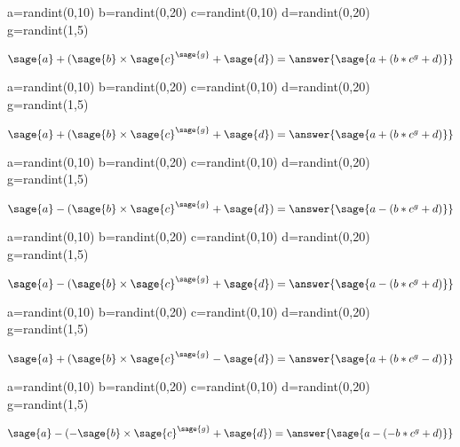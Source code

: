 \documentclass{ximera}
\begin{document}
\begin{problem}
\begin{sagesilent}
a=randint(0,10)
b=randint(0,20)
c=randint(0,10)
d=randint(0,20)
g=randint(1,5)
\end{sagesilent}
$ \sage{a} + (\sage{b} \times \sage{c}^{\sage{g}} + \sage{d}) =\answer{\sage{a+(b*c^g+d)}} $
\end{problem}


\begin{problem}
\begin{sagesilent}
a=randint(0,10)
b=randint(0,20)
c=randint(0,10)
d=randint(0,20)
g=randint(1,5)
\end{sagesilent}
$ \sage{a} + (\sage{b} \times \sage{c}^{\sage{g}} + \sage{d}) =\answer{\sage{a+(b*c^g+d)}} $
\end{problem}

\begin{problem}
\begin{sagesilent}
a=randint(0,10)
b=randint(0,20)
c=randint(0,10)
d=randint(0,20)
g=randint(1,5)
\end{sagesilent}
$ \sage{a} -(\sage{b} \times \sage{c}^{\sage{g}} + \sage{d}) =\answer{\sage{a-(b*c^g+d)}} $
\end{problem}

\begin{problem}
\begin{sagesilent}
a=randint(0,10)
b=randint(0,20)
c=randint(0,10)
d=randint(0,20)
g=randint(1,5)
\end{sagesilent}
$ \sage{a} - (\sage{b} \times \sage{c}^{\sage{g}} + \sage{d}) =\answer{\sage{a-(b*c^g+d)}} $
\end{problem}


\begin{problem}
\begin{sagesilent}
a=randint(0,10)
b=randint(0,20)
c=randint(0,10)
d=randint(0,20)
g=randint(1,5)
\end{sagesilent}
$ \sage{a} + (\sage{b} \times \sage{c}^{\sage{g}} - \sage{d}) =\answer{\sage{a+(b*c^g-d)}} $
\end{problem}

\begin{problem}
\begin{sagesilent}
a=randint(0,10)
b=randint(0,20)
c=randint(0,10)
d=randint(0,20)
g=randint(1,5)
\end{sagesilent}
$ \sage{a} - (-\sage{b} \times \sage{c}^{\sage{g}} + \sage{d}) =\answer{\sage{a-(-b*c^g+d)}} $
\end{problem}
\end{document}
